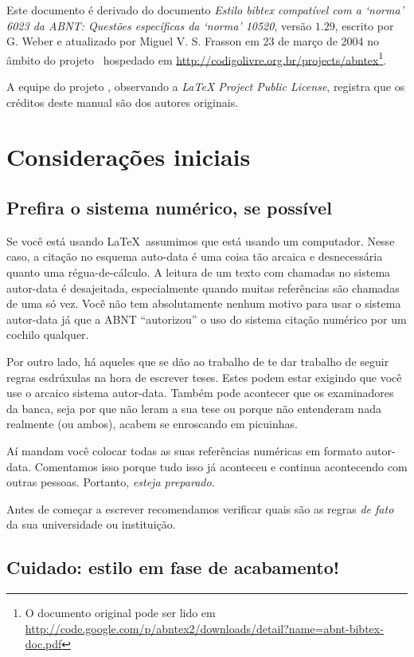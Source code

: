 \documentclass[a4paper]{ltxdoc}
\begin{document}
Este documento é derivado do documento \emph{Estilo bibtex compatível com a
`norma' 6023 da ABNT: Questões específicas da `norma' 10520}, versão $ 1.29
$, escrito por G. Weber e atualizado por Miguel V. S. Frasson em 23 de março de
2004 no âmbito do projeto \abnTeX\ hospedado em
\url{http://codigolivre.org.br/projects/abntex}\footnote{O documento original pode ser lido em
\url{http://code.google.com/p/abntex2/downloads/detail?name=abnt-bibtex-doc.pdf}}.

A equipe do projeto , observando a \emph{LaTeX Project Public License},
registra que os créditos deste manual são dos autores originais.


\section{Considerações iniciais}

\subsection{Prefira o sistema numérico, se possível}

Se você está usando \LaTeX\, assumimos que está usando um computador. Nesse
caso, a citação no esquema auto-data é uma coisa tão arcaica e desnecessária
quanto uma régua-de-cálculo. A leitura de um texto com chamadas no sistema
autor-data é desajeitada, especialmente quando muitas referências são chamadas
de uma só vez. Você não tem absolutamente nenhum motivo para usar o sistema
autor-data já que a ABNT ``autorizou'' o uso do sistema citação numérico
por um cochilo qualquer.

Por outro lado, há aqueles que se dão ao trabalho de te dar trabalho de seguir
regras esdrúxulas na hora de escrever teses. Estes podem estar exigindo que você
use o arcaico sistema autor-data. Também pode acontecer que os examinadores da
banca, seja por que não leram a sua tese ou porque não entenderam nada
realmente (ou ambos), acabem se enroscando em picuinhas.

Aí mandam você colocar todas as suas referências numéricas em formato
autor-data. Comentamos isso porque tudo isso já aconteceu e continua acontecendo 
com outras pessoas. Portanto, \emph{esteja preparado}. 

Antes de começar a escrever recomendamos verificar quais são as regras \emph{de
fato} da sua universidade ou instituição.

\subsection{Cuidado: estilo em fase de acabamento!}
\end{document}
